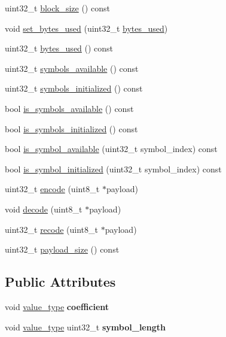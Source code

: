 \begin{DoxyCompactItemize}
\item 
uint32\-\_\-t \hyperlink{group__storage__api_ga80ff93571c5bf00ecdfd9c216ec5ffe3}{block\-\_\-size} () const 
\item 
void \hyperlink{group__storage__api_ga6a21be78a5ff875470f954e0b2a7bade}{set\-\_\-bytes\-\_\-used} (uint32\-\_\-t \hyperlink{group__storage__api_ga69e587579d2124c13d177957777c049f}{bytes\-\_\-used})
\item 
uint32\-\_\-t \hyperlink{group__storage__api_ga69e587579d2124c13d177957777c049f}{bytes\-\_\-used} () const 
\item 
uint32\-\_\-t \hyperlink{group__storage__api_ga00333865ea7e7f49745b81ab0cd0d3cc}{symbols\-\_\-available} () const 
\item 
uint32\-\_\-t \hyperlink{group__storage__api_gaf7e4f0c95779060d2e4a489fbf415543}{symbols\-\_\-initialized} () const 
\item 
bool \hyperlink{group__storage__api_ga5ae117017003f56eefe58371347598ec}{is\-\_\-symbols\-\_\-available} () const 
\item 
bool \hyperlink{group__storage__api_ga134051aecd385adf8ff559ef1e9bf087}{is\-\_\-symbols\-\_\-initialized} () const 
\item 
bool \hyperlink{group__storage__api_ga0159acc59a71f6e3fb0d1c2af289bb23}{is\-\_\-symbol\-\_\-available} (uint32\-\_\-t symbol\-\_\-index) const 
\item 
bool \hyperlink{group__storage__api_ga853c0ecb0f991f97a94fd92ee2591912}{is\-\_\-symbol\-\_\-initialized} (uint32\-\_\-t symbol\-\_\-index) const 
\item 
uint32\-\_\-t \hyperlink{group__payload__codec__api_ga8d9deb3b1062947bb305e938ff20689b}{encode} (uint8\-\_\-t $\ast$payload)
\item 
void \hyperlink{group__payload__codec__api_gaa19a3256acd51356401762ee79d21d95}{decode} (uint8\-\_\-t $\ast$payload)
\item 
uint32\-\_\-t \hyperlink{group__payload__codec__api_ga210cf0d2ea9c66ac32557ac265eb95c6}{recode} (uint8\-\_\-t $\ast$payload)
\item 
uint32\-\_\-t \hyperlink{group__payload__codec__api_gae41a009ed90022aab131c1078bf8c773}{payload\-\_\-size} () const 
\end{DoxyCompactItemize}
\subsection*{Public Attributes}
\begin{DoxyCompactItemize}
\item 
\hypertarget{classlayer_a4866c8b11b8ef8889203b1e134140284}{void \hyperlink{classlayer_a3ad6d6930927932e5c25f2a2b5277cc0}{value\-\_\-type} {\bfseries coefficient}}\label{classlayer_a4866c8b11b8ef8889203b1e134140284}

\item 
\hypertarget{classlayer_a2e29ffa93e46fdf31a269179cc1d62e1}{void \hyperlink{classlayer_a3ad6d6930927932e5c25f2a2b5277cc0}{value\-\_\-type} uint32\-\_\-t {\bfseries symbol\-\_\-length}}\label{classlayer_a2e29ffa93e46fdf31a269179cc1d62e1}

\end{DoxyCompactItemize}


